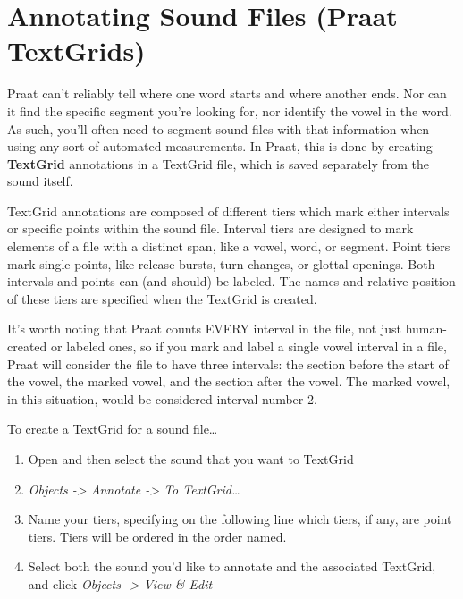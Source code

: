 \hypertarget{annotating-sound-files-praat-textgrids}{%
\section{Annotating Sound Files (Praat
TextGrids)}\label{annotating-sound-files-praat-textgrids}}

\label{sec:TextGridding}

Praat can't reliably tell where one word starts and where another ends.
Nor can it find the specific segment you're looking for, nor identify
the vowel in the word. As such, you'll often need to segment sound files
with that information when using any sort of automated measurements. In
Praat, this is done by creating \textbf{TextGrid} annotations in a
TextGrid file, which is saved separately from the sound itself.

TextGrid annotations are composed of different tiers which mark either
intervals or specific points within the sound file. Interval tiers are
designed to mark elements of a file with a distinct span, like a vowel,
word, or segment. Point tiers mark single points, like release bursts,
turn changes, or glottal openings. Both intervals and points can (and
should) be labeled. The names and relative position of these tiers are
specified when the TextGrid is created.

It's worth noting that Praat counts EVERY interval in the file, not just
human-created or labeled ones, so if you mark and label a single vowel
interval in a file, Praat will consider the file to have three
intervals: the section before the start of the vowel, the marked vowel,
and the section after the vowel. The marked vowel, in this situation,
would be considered interval number 2.

To create a TextGrid for a sound file\ldots{}

\begin{enumerate}
\def\labelenumi{\arabic{enumi}.}
\tightlist
\item
  Open and then select the sound that you want to TextGrid
\item
  \emph{Objects -\textgreater{} Annotate -\textgreater{} To
  TextGrid\ldots{}}
\item
  Name your tiers, specifying on the following line which tiers, if any,
  are point tiers. Tiers will be ordered in the order named.
\item
  Select both the sound you'd like to annotate and the associated
  TextGrid, and click \emph{Objects -\textgreater{} View \& Edit}
\end{enumerate}

